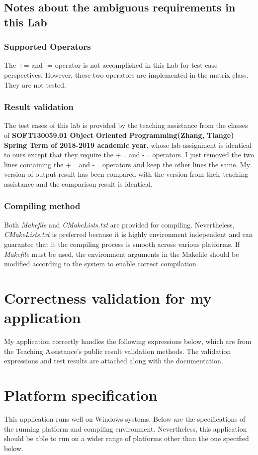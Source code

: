 \documentclass[a4paper]{report}
\begin{document}
\section{Notes about the ambiguous requirements in this Lab}

\subsection{Supported Operators}
The += and -= operator is not accomplished in this Lab for test case perspectives. However, these two operators are implemented in the matrix class. They are not tested.
\subsection{Result validation}
The test cases of this lab is provided by the teaching assistance from the classes of \textbf{SOFT130059.01 Object Oriented Programming(Zhang, Tiange) Spring Term of 2018-2019 academic year}, whose lab assignment is identical to ours except that they require the += and -= operators. I just removed the two lines containing the += and -= operators and keep the other lines the same. My version of output result has been compared with the version from their teaching assistance and the comparison result is identical.
\subsection{Compiling method}
Both \emph{Makefile} and \emph{CMakeLists.txt} are provided for compiling. Nevertheless, \emph{CMakeLists.txt} is preferred because it is highly environment independent and can guarantee that it the compiling process is smooth across various platforms. If \emph{Makefile} must be used, the environment arguments in the Makefile should be modified according to the system to enable correct compilation.
\chapter{Correctness validation for my application}
My application correctly handles the following expressions below, which are from the Teaching Assistance's public result validation methods. 
The validation expressions and test results are attached along with the documentation.
\chapter{Platform specification}
This application runs well on Windows systems. Below are the specifications of the running platform and compiling environment. Nevertheless, this application should be able to run on a wider range of platforms other than the one specified below.
\end{document}
